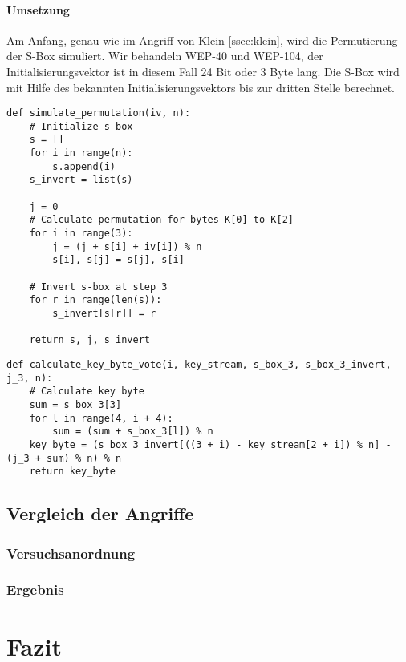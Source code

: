 \documentclass[10pt,a4paper]{article}
\begin{document}
\paragraph{Umsetzung}
Am Anfang, genau wie im Angriff von Klein \ref{ssec:klein}, wird die Permutierung der S-Box simuliert. Wir behandeln WEP-40 und WEP-104, der Initialisierungsvektor ist in diesem Fall 24 Bit oder 3 Byte lang. Die S-Box wird mit Hilfe des bekannten Initialisierungsvektors bis zur dritten Stelle berechnet.
\begin{lstlisting}
def simulate_permutation(iv, n):
    # Initialize s-box
    s = []
    for i in range(n):
        s.append(i)
    s_invert = list(s)

    j = 0
    # Calculate permutation for bytes K[0] to K[2]
    for i in range(3):
        j = (j + s[i] + iv[i]) % n
        s[i], s[j] = s[j], s[i]

    # Invert s-box at step 3
    for r in range(len(s)):
        s_invert[s[r]] = r

    return s, j, s_invert
\end{lstlisting}
\begin{lstlisting}
def calculate_key_byte_vote(i, key_stream, s_box_3, s_box_3_invert, j_3, n):
    # Calculate key byte
    sum = s_box_3[3]
    for l in range(4, i + 4):
        sum = (sum + s_box_3[l]) % n
    key_byte = (s_box_3_invert[((3 + i) - key_stream[2 + i]) % n] - (j_3 + sum) % n) % n
    return key_byte
\end{lstlisting}

\subsection{Vergleich der Angriffe}
\label{subsec:vergleich}

\subsubsection{Versuchsanordnung}


\subsubsection{Ergebnis}

\section{Fazit}
\newpage
\nocite{*}
\printbibliography
\end{document}
